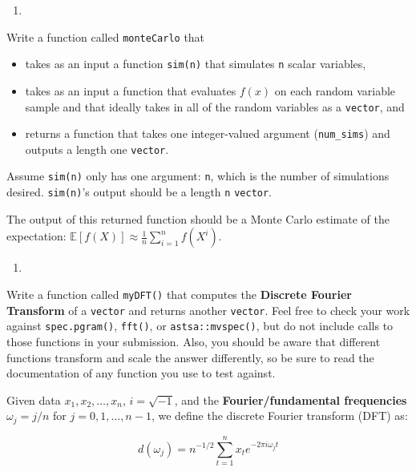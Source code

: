 \documentclass[
  12pt,
  krantz2]{krantz}
\providecommand{\tightlist}{%
  \setlength{\itemsep}{0pt}\setlength{\parskip}{0pt}}
\begin{document}
\begin{enumerate}
\def\labelenumi{\arabic{enumi}.}
\setcounter{enumi}{1}
\tightlist
\item
\end{enumerate}

Write a function called \texttt{monteCarlo} that

\begin{itemize}
\tightlist
\item
  takes as an input a function \texttt{sim(n)} that simulates \texttt{n} scalar variables,\\
\item
  takes as an input a function that evaluates \(f(x)\) on each random variable sample and that ideally takes in all of the random variables as a \texttt{vector}, and
\item
  returns a function that takes one integer-valued argument (\texttt{num\_sims}) and outputs a length one \texttt{vector}.
\end{itemize}

Assume \texttt{sim(n)} only has one argument: \texttt{n}, which is the number of simulations desired. \texttt{sim(n)}'s output should be a length \texttt{n} \texttt{vector}.

The output of this returned function should be a Monte Carlo estimate of the expectation: \(\mathbb{E}[f(X)] \approx \frac{1}{n}\sum_{i=1}^n f(X^i)\).

\begin{enumerate}
\def\labelenumi{\arabic{enumi}.}
\setcounter{enumi}{2}
\tightlist
\item
\end{enumerate}

Write a function called \texttt{myDFT()} that computes the \textbf{Discrete Fourier Transform} of a \texttt{vector} and returns another \texttt{vector}. Feel free to check your work against \texttt{spec.pgram()}, \texttt{fft()}, or \texttt{astsa::mvspec()}, but do not include calls to those functions in your submission. Also, you should be aware that different functions transform and scale the answer differently, so be sure to read the documentation of any function you use to test against.

Given data \(x_1,x_2,\ldots,x_n\), \(i = \sqrt{-1}\), and the \textbf{Fourier/fundamental frequencies} \(\omega_j= j/n\) for \(j=0,1,\ldots,n-1\), we define the discrete Fourier transform (DFT) as:

\begin{equation} \label{eq:DFT}
d(\omega_j)= n^{-1/2} \sum_{t=1}^n x_t e^{-2 \pi i \omega_j t}
\end{equation}
\end{document}
